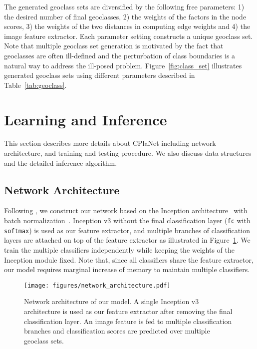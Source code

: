 \documentclass[runningheads]{llncs}
\begin{document}
The generated geoclass sets are diversified by the following free parameters: 1) the desired number of final geoclasses, 2) the weights of the factors in the node scores, 3) the weights of the two distances in computing edge weights and 4) the image feature extractor.
Each parameter setting constructs a unique geoclass set.
Note that multiple geoclass set generation is motivated by the fact that geoclasses are often ill-defined and the perturbation of class boundaries is a natural way to address the ill-posed problem.
Figure~\ref{fig:class_set} illustrates generated geoclass sets using different parameters described in Table~\ref{tab:geoclass}.


 

\section{Learning and Inference}
\label{sec:learning}
This section describes more details about CPlaNet including network architecture, and training and testing procedure.
We also discuss data structures and the detailed inference algorithm. 

\subsection{Network Architecture}
\label{sub:training}
Following \cite{weyand16planet}, we construct our network based on the Inception architecture~\cite{szegedy2015going} with batch normalization~\cite{szegedy2016rethinking}.
Inception v3 without the final classification layer (\texttt{fc} with \texttt{softmax}) is used as our feature extractor, and multiple branches of classification layers are attached on top of the feature extractor as illustrated in Figure~\ref{fig:net_arch}.
We train the multiple classifiers independently while keeping the weights of the Inception module fixed.
Note that, since all classifiers share the feature extractor, our model requires marginal increase of memory to maintain multiple classifiers.
\begin{figure}[t]
\centering
\texttt{[image: figures/network\_architecture.pdf]}
\caption{
Network architecture of our model. 
A single Inception v3 architecture is used as our feature extractor after removing the final classification layer.
An image feature is fed to multiple classification branches and classification scores are predicted over multiple geoclass sets.
}
\label{fig:net_arch}
\end{figure}
\end{document}
